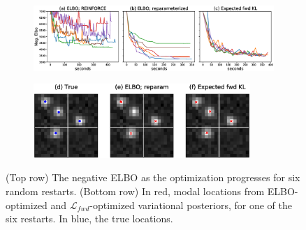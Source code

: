 \begin{figure}[!htb]
    \centering
    \begin{subfigure}[t]{0.9\textwidth}
    \centering
    \includegraphics[width=\textwidth]{figures_vg/elbo_vs_sleep/optim_path_compare.eps}
    \end{subfigure}
    \begin{subfigure}[t]{\textwidth}
    \centering
    \includegraphics[width=0.9\textwidth]{figures_vg/elbo_vs_sleep/optim_path_detect_compare.eps}
    \end{subfigure}
    \caption{(Top row) The negative ELBO as the optimization progresses for six random restarts.
    (Bottom row) In red, modal locations from ELBO-optimized and $\mathcal{L}_{fwd}$-optimized variational posteriors, for one of the six restarts.
    In blue, the true locations. }
    \label{fig:optim_path}
\end{figure}


